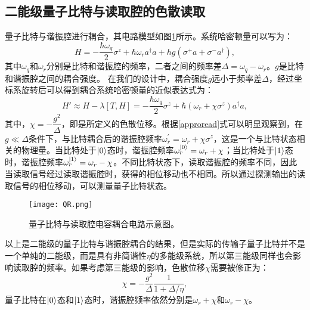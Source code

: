 \subsection{二能级量子比特与读取腔的色散读取}
量子比特与谐振腔进行耦合，其电路模型如图\ref{fig:QR}所示。系统哈密顿量可以写为：
\begin{equation}
	H = -\dfrac{\hbar\omega_{q}}{2}\sigma^{z}+\hbar\omega_{r}a^{\dagger}a+hg(\sigma^{+}a+\sigma^{-}a^{\dagger}),
\end{equation}
其中$ \omega_{q}$和$\omega_{r}$分别是比特和谐振腔的频率，二者之间的频率差$ \Delta=\omega_{q}-\omega_{r}$。$ g$是比特和谐振腔之间的耦合强度。
在我们的设计中，耦合强度$g$远小于频率差$ \Delta$，经过坐标系旋转后可以得到耦合系统哈密顿量的近似表达式为：
\begin{equation}\label{approread}
	H'\approx H-\lambda[T,H]=-\dfrac{\hbar\omega_{q}}{2}\sigma^{z}+\hbar(\omega_{r}+\chi\sigma^{z})a^{\dagger}a,
\end{equation}
其中，$\chi=-\dfrac{g^{2}}{\Delta}$，即是所定义的色散位移。根据\ref{approread}式可以明显观察到，在$ g \ll \Delta$条件下，与比特耦合后的谐振腔频率$\omega_{r}^{'}=\omega_{r}+\chi\sigma^{z}$，这是一个与比特状态相关的物理量。当比特处于$\left|0\right>$态时，谐振腔频率$\omega_{r}^{\left|0\right>} = \omega_{r}+\chi$；当比特处于$\left|1\right>$态时，谐振腔频率$\omega_{r}^{\left|1\right>} =\omega_{r}-\chi$。不同比特状态下，读取谐振腔的频率不同，因此当读取信号经过读取谐振腔时，获得的相位移动也不相同。所以通过探测输出的读取信号的相位移动，可以测量量子比特状态。

\begin{figure}[h]
	\centering
	\texttt{[image: QR.png]}
	\caption{量子比特与读取腔电容耦合电路示意图。}
	\label{fig:QR}
\end{figure}

以上是二能级的量子比特与谐振腔耦合的结果，但是实际的传输子量子比特并不是一个单纯的二能级，而是具有非简谐性$ \eta$的多能级系统，所以第三能级同样也会影响读取腔的频率。如果考虑第三能级的影响，色散位移$ \chi$需要被修正为\cite{sank2014fast}：
\begin{equation}
	\chi = -\dfrac{g^{2}}{\Delta}\dfrac{1}{1+\Delta/\eta},
\end{equation}
量子比特在$\left|0\right>$态和$\left|1\right>$态时，谐振腔频率依然分别是$\omega_{r}+\chi$和$\omega_{r}-\chi$。
